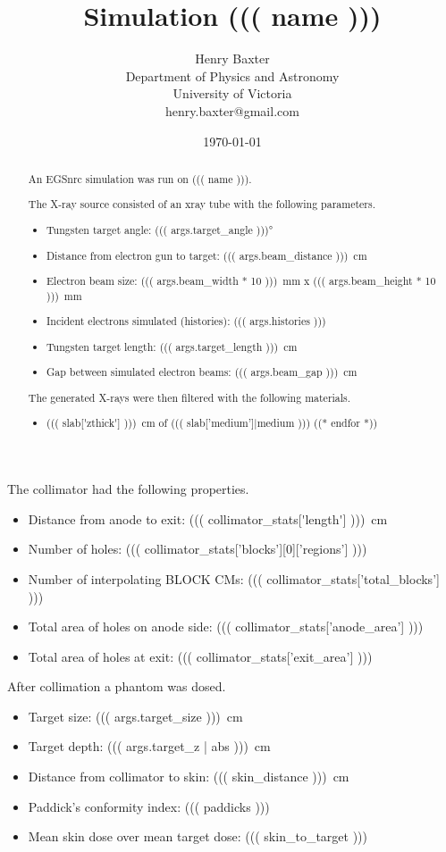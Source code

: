 \documentclass[12pt]{article}
\title{Simulation ((( name )))}
\author{
        Henry Baxter \\
                Department of Physics and Astronomy\\
        University of Victoria\\
        henry.baxter@gmail.com
}
\date{\today}
\begin{document}
\maketitle

\begin{abstract}
An EGSnrc simulation was run on ((( name ))).

The X-ray source consisted of an xray tube with the following parameters.
\begin{itemize}
	\item Tungsten target angle: \ang{((( args.target_angle )))}
	\item Distance from electron gun to target: \SI{((( args.beam_distance )))}{\cm}
	\item Electron beam size: \SI{((( args.beam_width * 10 )))}{\mm} x \SI{((( args.beam_height * 10 )))}{\mm}
	\item Incident electrons simulated (histories): ((( args.histories )))
	\item Tungsten target length: \SI{((( args.target_length )))}{\cm}
	\item Gap between simulated electron beams: \SI{((( args.beam_gap )))}{\cm}
\end{itemize}

The generated X-rays were then filtered with the following materials.
\begin{itemize}
	((* for slab in _filter['cms']['slabs'] *))
	\item \SI{((( slab['zthick'] )))}{\cm} of ((( slab['medium']|medium )))
	((* endfor *))
\end{itemize}
\end{abstract}

The collimator had the following properties.
\begin{itemize}
	\item Distance from anode to exit: \SI{((( collimator_stats['length'] )))}{\cm}
	\item Number of holes: ((( collimator_stats['blocks'][0]['regions'] )))
	\item Number of interpolating BLOCK CMs: ((( collimator_stats['total_blocks'] )))
	\item Total area of holes on anode side: ((( collimator_stats['anode_area'] )))
	\item Total area of holes at exit: ((( collimator_stats['exit_area'] )))
\end{itemize}

After collimation a phantom was dosed.
\begin{itemize}
	\item Target size: \SI{((( args.target_size )))}{\cm}
	\item Target depth: \SI{((( args.target_z | abs )))}{\cm}
	\item Distance from collimator to skin: \SI{((( skin_distance )))}{\cm}
	\item Paddick's conformity index: ((( paddicks )))
	\item Mean skin dose over mean target dose: ((( skin_to_target )))
\end{itemize}
\end{document}
